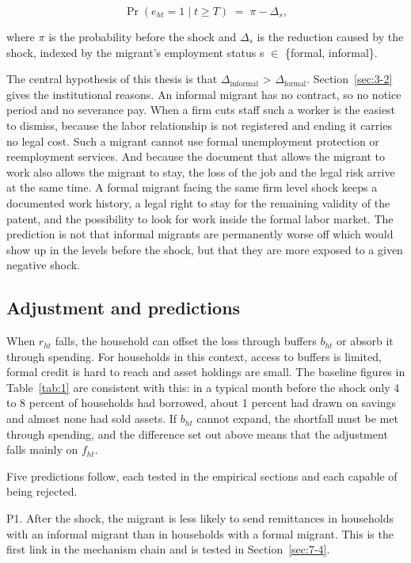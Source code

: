 \begin{equation}\label{eq:shock}
\Pr\!\left(e_{ht}=1 \mid t \geq T\right) \;=\; \pi - \Delta_{s},
\end{equation}

where $\pi$ is the probability before the shock and $\Delta_{s}$ is the reduction caused by the shock, indexed by the migrant's employment status s $\in$ \{formal, informal\}.

The central hypothesis of this thesis is that $\Delta_{\text{informal}}$ > $\Delta_{\text{formal}}$. Section~\ref{sec:3-2} gives the institutional reasons. An informal migrant has no contract, so no notice period and no severance pay. When a firm cuts staff such a worker is the easiest to dismiss, because the labor relationship is not registered and ending it carries no legal cost. Such a migrant cannot use formal unemployment protection or reemployment services. And because the document that allows the migrant to work also allows the migrant to stay, the loss of the job and the legal risk arrive at the same time. A formal migrant facing the same firm level shock keeps a documented work history, a legal right to stay for the remaining validity of the patent, and the possibility to look for work inside the formal labor market. The prediction is not that informal migrants are permanently worse off which would show up in the levels before the shock, but that they are more exposed to a given negative shock.

\subsection{Adjustment and predictions}\label{sec:4-3}

When $r_{ht}$ falls, the household can offset the loss through buffers $b_{ht}$ or absorb it through spending. For households in this context, access to buffers is limited, formal credit is hard to reach and asset holdings are small. The baseline figures in Table~\ref{tab:1} are consistent with this: in a typical month before the shock only 4 to 8 percent of households had borrowed, about 1 percent had drawn on savings and almost none had sold assets. If $b_{ht}$ cannot expand, the shortfall must be met through spending, and the difference set out above means that the adjustment falls mainly on $f_{ht}$.

Five predictions follow, each tested in the empirical sections and each capable of being rejected.

P1. After the shock, the migrant is less likely to send remittances in households with an informal migrant than in households with a formal migrant. This is the first link in the mechanism chain and is tested in Section~\ref{sec:7-4}.

